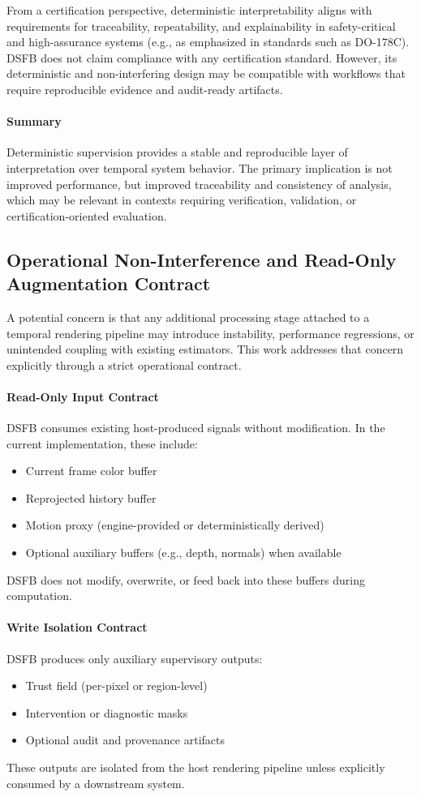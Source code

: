 \documentclass[11pt,letterpaper]{article}
\theoremstyle{gcresult}
\theoremstyle{definition}
\begin{document}
From a certification perspective, deterministic interpretability aligns with requirements for traceability, repeatability, and explainability in safety-critical and high-assurance systems (e.g., as emphasized in standards such as DO-178C). DSFB does not claim compliance with any certification standard. However, its deterministic and non-interfering design may be compatible with workflows that require reproducible evidence and audit-ready artifacts.

\paragraph{Summary}
Deterministic supervision provides a stable and reproducible layer of interpretation over temporal system behavior. The primary implication is not improved performance, but improved traceability and consistency of analysis, which may be relevant in contexts requiring verification, validation, or certification-oriented evaluation.

\subsection{Operational Non-Interference and Read-Only Augmentation Contract}

A potential concern is that any additional processing stage attached to a temporal rendering pipeline may introduce instability, performance regressions, or unintended coupling with existing estimators. This work addresses that concern explicitly through a strict operational contract.

\paragraph{Read-Only Input Contract}
DSFB consumes existing host-produced signals without modification. In the current implementation, these include:
\begin{itemize}
    \item Current frame color buffer
    \item Reprojected history buffer
    \item Motion proxy (engine-provided or deterministically derived)
    \item Optional auxiliary buffers (e.g., depth, normals) when available
\end{itemize}
DSFB does not modify, overwrite, or feed back into these buffers during computation.

\paragraph{Write Isolation Contract}
DSFB produces only auxiliary supervisory outputs:
\begin{itemize}
    \item Trust field (per-pixel or region-level)
    \item Intervention or diagnostic masks
    \item Optional audit and provenance artifacts
\end{itemize}
These outputs are isolated from the host rendering pipeline unless explicitly consumed by a downstream system.
\end{document}
